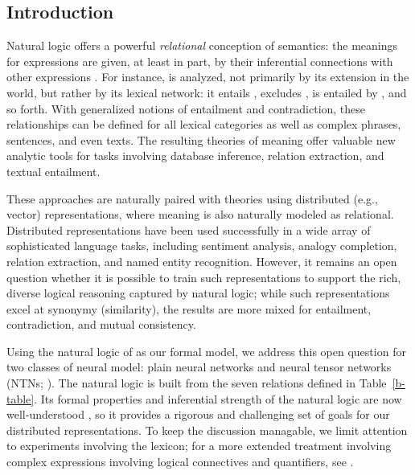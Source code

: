 \subsection*{Introduction}\label{sec:intro}

Natural logic offers a powerful \emph{relational} conception of
semantics: the meanings for expressions are given, at least in part,
by their inferential connections with other expressions
\cite{vanBenthem08NATLOG,maccartney2009extended}. For instance,
 is analyzed, not primarily by its extension in the
world, but rather by its lexical network: it entails ,
excludes , is entailed by , and so forth. With generalized notions of entailment and
contradiction, these relationships can be defined for all lexical
categories as well as complex phrases, sentences, and even texts. The
resulting theories of meaning offer valuable new analytic tools for
tasks involving database inference, relation extraction, and textual
entailment.

These approaches are naturally paired with theories using distributed
(e.g., vector) representations, where meaning is also naturally
modeled as relational. Distributed representations have been used
successfully in a wide array of sophisticated language tasks,
including sentiment analysis, analogy completion, relation extraction,
and named entity recognition. However, it remains an open question
whether it is possible to train such representations to support the
rich, diverse logical reasoning captured by natural logic; while such
representations excel at synonymy (similarity), the results are more
mixed for entailment, contradiction, and mutual consistency.

Using the natural logic of \cite{maccartney2009extended} as our formal
model, we address this open question for two classes of neural model:
plain neural networks and neural tensor networks (NTNs;
\cite{socher2013acl1}). The natural logic is built from the seven
relations defined in Table~\ref{b-table}. Its formal properties and
inferential strength of the natural logic are now well-understood
\cite{Icard:Moss:2013,Icard:Moss:2013:LILT}, so it provides a rigorous
and challenging set of goals for our distributed representations. To
keep the discussion managable, we limit attention to experiments
involving the lexicon; for a more extended treatment involving complex
expressions involving logical connectives and quantifiers, see
\cite{Bowman:Potts:Manning:2014}.

